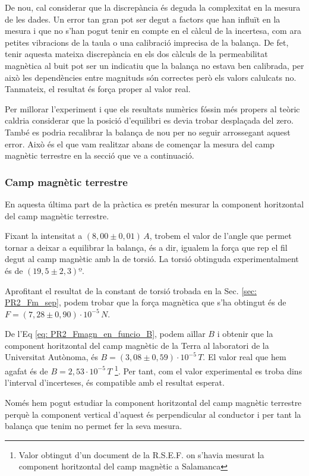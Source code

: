 \documentclass[11pt]{article}
\numberwithin{equation}{section}
\numberwithin{figure}{section}
\numberwithin{table}{section}
\begin{document}
De nou, cal considerar que la discrepància és deguda la complexitat en la mesura de les dades. Un error tan gran pot ser degut a factors que han influït en la mesura i que no s’han pogut tenir en compte en el càlcul de la incertesa, com ara petites vibracions de la taula o una calibració imprecisa de la balança. De fet, tenir aquesta mateixa discrepància en els dos càlculs de la permeabilitat magnètica al buit pot ser un indicatiu que la balança no estava ben calibrada, per això les dependències entre magnituds són correctes però els valors calulcats no. Tanmateix, el resultat és força proper al valor real.

Per millorar l'experiment i que els resultats numèrics fóssin més propers al teòric caldria considerar que la posició d'equilibri es devia trobar desplaçada del zero. També es podria recalibrar la balança de nou per no seguir arrossegant aquest error. Això és el que vam realitzar abans de començar la mesura del camp magnètic terrestre en la secció que ve a continuació.

\subsubsection{Camp magnètic terrestre}\label{sec: PR2_Bterra}

En aquesta última part de la pràctica es pretén mesurar la component horitzontal del camp magnètic terrestre. 

Fixant la intensitat a $(8,00 \pm 0,01)\,A$, trobem el valor de l'angle que permet tornar a deixar a equilibrar la balança, és a dir, igualem la força que rep el fil degut al camp magnètic amb la de torsió. La torsió obtinguda experimentalment és de $(19,5 \pm 2,3)º$. 

Aprofitant el resultat de la constant de torsió trobada en la Sec. \ref{sec: PR2_Fm_sep}, podem trobar que la força magnètica que s’ha obtingut és de $F = (7,28 \pm 0,90) \cdot 10^{-5}\,N$. 

De l’Eq \eqref{eq: PR2_Fmagn_en_funcio_B}, podem aïllar $B$ i obtenir que la component horitzontal del camp magnètic de la Terra al laboratori de la Universitat Autònoma, és $B = (3,08 \pm 0,59)·10^{-5}\,T$. El valor real que hem agafat és de $B = 2,53·10^{−5}\,T$ \footnote{Valor obtingut d'un document de la R.S.E.F. on s'havia mesurat la component horitzontal del camp magnètic a Salamanca}. Per tant, com el valor experimental es troba dins l’interval d’incerteses, és compatible amb el resultat esperat.

Només hem pogut estudiar la component horitzontal del camp magnètic terrestre perquè la component vertical d’aquest és perpendicular al conductor i per tant la balança que tenim no permet fer la seva mesura.
\end{document}
